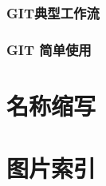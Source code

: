 \documentclass[amstex,twoside]{ctexbook}
\begin{document}
\subsection{  GIT典型工作流	}
\subsection{  GIT 简单使用	}


\appendix



\chapter{名称缩写}

\chapter{图片索引}
{
\renewcommand{\cleardoublepage}{}

\renewcommand\listfigurename{}
\vskip -3cm
\listoffigures 
}


\end{document}
